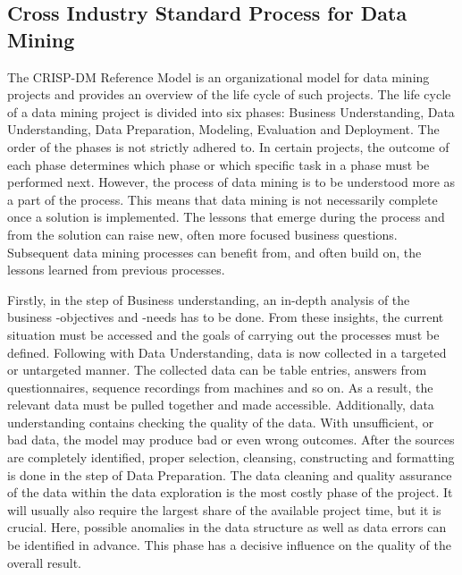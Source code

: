 \subsection{Cross Industry Standard Process for Data Mining}

The CRISP-DM Reference Model is an organizational model for data mining projects and provides
an overview of the life cycle of such projects.  
The life cycle of a data mining project is divided into six phases: Business Understanding,
Data Understanding, Data Preparation, Modeling, Evaluation and Deployment. 
The order of the phases is not strictly adhered to. In certain projects,
the outcome of each phase determines which phase or which specific task in a phase must be performed next.
However, the process of data mining is to be understood more as a part of the process.
This means that data mining is not necessarily complete once a solution is implemented. 
The lessons that emerge during the process and from the solution can raise new,
often more focused business questions. 
Subsequent data mining processes can benefit from, and often build on,
the lessons learned from previous processes.

Firstly, in the step of Business understanding, an in-depth analysis of the business -objectives and -needs has to be done. 
From these insights, the current situation must be accessed and the goals of carrying out the processes must be defined. 
Following with Data Understanding, data is now collected in a targeted or untargeted manner. 
The collected data can be table entries, answers from questionnaires, sequence recordings from machines and so on. 
As a result, the relevant data must be pulled together and made accessible. Additionally, data understanding contains checking the quality of the data.
With unsufficient, or bad data, the model may produce bad or even wrong outcomes.
After the sources are completely identified, proper selection, cleansing, constructing and formatting is done in the step of Data Preparation. 
The data cleaning and quality assurance of the data within the data exploration is the most costly phase of the project. 
It will usually also require the largest share of the available project time, but it is crucial. Here, possible anomalies in the data structure as well as data errors can be identified in advance. 
This phase has a decisive influence on the quality of the overall result. 

